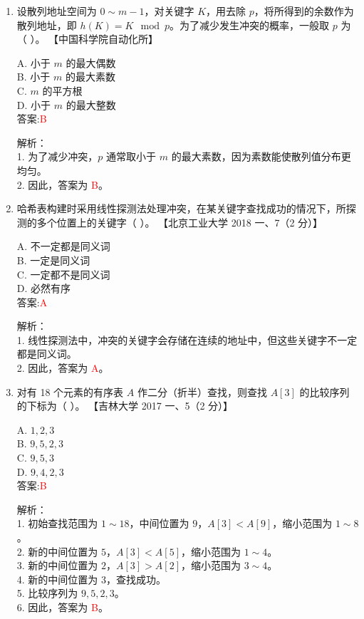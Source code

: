 \documentclass[lang=cn,newtx,10pt,scheme=chinese]{../../../elegantbook}
\begin{document}
\begin{enumerate}
\item 设散列地址空间为 $0 \sim m-1$，对关键字 $K$，用去除 $p$，将所得到的余数作为散列地址，即 $h(K) = K \mod p$。为了减少发生冲突的概率，一般取 $p$ 为（ ）。  
    【中国科学院自动化所】  

    A. 小于 $m$ 的最大偶数 \\  
    B. 小于 $m$ 的最大素数 \\  
    C. $m$ 的平方根 \\  
    D. 小于 $m$ 的最大整数 \\  

    答案:\textcolor{red}{B}

    解析：\\
    1. 为了减少冲突，$p$ 通常取小于 $m$ 的最大素数，因为素数能使散列值分布更均匀。\\
    2. 因此，答案为 \textcolor{red}{B}。\\

\item 哈希表构建时采用线性探测法处理冲突，在某关键字查找成功的情况下，所探测的多个位置上的关键字（ ）。  
    【北京工业大学 2018 一、7（2 分）】  

    A. 不一定都是同义词 \\  
    B. 一定是同义词 \\  
    C. 一定都不是同义词 \\  
    D. 必然有序 \\  

    答案:\textcolor{red}{A}

    解析：\\
    1. 线性探测法中，冲突的关键字会存储在连续的地址中，但这些关键字不一定都是同义词。\\
    2. 因此，答案为 \textcolor{red}{A}。\\

\item 对有 18 个元素的有序表 $A$ 作二分（折半）查找，则查找 $A[3]$ 的比较序列的下标为（ ）。  
    【吉林大学 2017 一、5（2 分）】  

    A. $1, 2, 3$ \\  
    B. $9, 5, 2, 3$ \\  
    C. $9, 5, 3$ \\  
    D. $9, 4, 2, 3$ \\  

    答案:\textcolor{red}{B}

    解析：\\
    1. 初始查找范围为 $1 \sim 18$，中间位置为 $9$，$A[3] < A[9]$，缩小范围为 $1 \sim 8$。\\
    2. 新的中间位置为 $5$，$A[3] < A[5]$，缩小范围为 $1 \sim 4$。\\
    3. 新的中间位置为 $2$，$A[3] > A[2]$，缩小范围为 $3 \sim 4$。\\
    4. 新的中间位置为 $3$，查找成功。\\
    5. 比较序列为 $9, 5, 2, 3$。\\
    6. 因此，答案为 \textcolor{red}{B}。\\

\end{enumerate}
\end{document}
